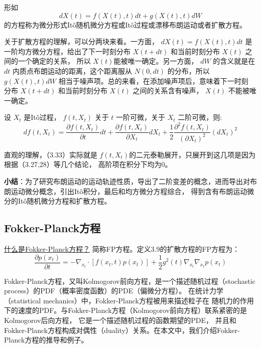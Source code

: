 \begin{definition}[扩散方程]
  形如
  \begin{equation}
    d X(t)=f(X(t), t) d t+g(X(t), t) d W
  \end{equation}
  的方程称为微分形式Itô随机微分方程或Itô过程或漂移布朗运动或者扩散方程。
\end{definition}
关于扩散方程的理解，可以分两块来看。一方面， $d X(t)=f(X(t), t) d t$
是一阶均方微分方程，给出了下一时刻分布 $X(t+d t)$ 和当前时刻分布 $X(t)$ 之间的一个确定的关系，
所以 $X(t)$能被唯一确定。另一方面， $d W$ 的含义就是在 $d t$ 内质点布朗运动的距离，这个距离服从
$N(0, d t)$ 的分布，所以 $g(X(t), t) d W$ 相当于噪声项。总的来看，在添加噪声项后，意味着下一时刻
分布 $X(t+d t)$ 和当前时刻分布 $X(t)$ 之间的关系含有噪声， $X(t)$ 不能被唯一确定。

\begin{lemma}[Itô引理]
  设 $X_t$ 是Itô过程， $f\left(t, X_t\right)$ 关于 $t$ 一阶可微，关于 $X_t$ 二阶可微，则:
\begin{equation}
  d f\left(t, X_t\right)=\frac{\partial f\left(t, X_t\right)}{\partial t} d t+\frac{\partial f\left(t, X_t\right)}{\partial X_t} d X_t+\frac{1}{2} \frac{\partial^2 f\left(t, X_t\right)}{\left(\partial X_t\right)^2}\left(d X_t\right)^2
\end{equation}
\end{lemma}
直观的理解，（3.33）实际就是 $f(t, X_t)$的二元泰勒展开，只展开到这几项是因为根据（3.27,28）等几个结论，
高阶项在积分下均为0。

\textbf{小结}：为了研究布朗运动的运动轨迹性质，导出了二阶变差的概念，进而导出对布朗运动微分概念，引出Itô积分，最后和均方微分方程综合，
得到含有布朗运动微分的Itô随机微分方程和扩散方程。

\subsection{Fokker-Planck方程}
\href{https://zhuanlan.zhihu.com/p/535688931}{什么是Fokker-Planck方程？}
简称FP方程。定义3.9的扩散方程的FP方程为：
\begin{equation}
  \frac{\partial p\left(x_t\right)}{\partial t}=-\nabla_{x_t} \cdot\left[f\left(x_t, t\right) p\left(x_t\right)\right]+\frac{1}{2} g^2(t) \nabla_{x_t} \nabla_{x_t} p\left(x_t\right)
\end{equation}

Fokker-Planck方程，又叫Kolmogorov前向方程，是一个描述随机过程（stochastic process）的PDF（概率密度函数）的PDE（偏微分方程）。
在统计力学（statistical mechanics）中，Fokker-Planck方程被用来描述粒子在
随机力的作用下的速度的PDF。与Fokker-Planck方程（Kolmogorov前向方程）联系紧密的是Kolmogorov后向方程，
它是一个描述随机过程的函数期望的PDE，
并且和Fokker-Planck方程构成对偶性（duality）关系。在本文中，我们介绍Fokker-Planck方程的推导和例子。

